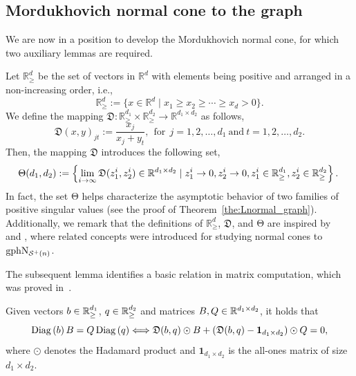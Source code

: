 \subsection{Mordukhovich normal cone to the graph}\label{sec:Mordukhovichnormalcone}
We are now in a position to develop the Mordukhovich normal cone, for which two auxiliary lemmas are required.


Let $\mathbb{R} _{\ge}^{d}$ be the set of vectors in $\mathbb{R}^{d}$ with elements being positive and arranged in a non-increasing order, i.e.,
\begin{equation*}
    \mathbb{R} _{\ge}^{d}:=\{ x\in \mathbb{R} ^d\mid x_1\ge x_2\ge \cdots \ge x_d>0 \}.
\end{equation*}
We define the mapping $\mathfrak{D}:\mathbb{R} _{\ge}^{d_1}\times \mathbb{R} _{\ge}^{d_2}\rightarrow \mathbb{R} ^{d_1\times d_2}$ as follows,
\begin{equation*}
    \mathfrak{D}( x,y) _{jt}:=\frac{x_j}{x_j+y_t},\ \ \text{for}\ \ j=1,2,\dots,d_1\ \text{and}\ t=1,2,\ldots,d_2.
\end{equation*}
Then, the mapping $\mathfrak{D}$ introduces the following set,
\begin{equation}\label{eq:varTheta}
    \!\!\mathrm{\Theta}( d_1,d_2 ) :=\left\{ { \lim _{i\rightarrow \infty}\mathfrak{D}( z_{1}^{i},z_{2}^{i} )\in \mathbb{R} ^{d_1\times d_2}\mid z_{1}^{i}\rightarrow 0,z_{2}^{i}\rightarrow 0,z_{1}^{i}\in \mathbb{R} _{\ge}^{d_1},z_{2}^{i}\in \mathbb{R} _{\ge}^{d_2} } \right\}.
\end{equation}
In fact, the set $\mathrm{\Theta}$ helps characterize the asymptotic behavior of two families of positive singular values (see the proof of Theorem~\ref{the:Lnormal_graph}). Additionally, we remark that the definitions of $\mathbb{R} _{\ge}^{d}$, $\mathfrak{D}$, and $\mathrm{\Theta}$ are inspired by~\cite[\S3.2]{ding2014SDCMPCC} and \cite[\S3.2]{wu2014SDCMPCC}, where related concepts were introduced for studying normal cones to $\mathrm{gph}\mathrm{N}_{\mathcal{S}^+(n)}$.

The subsequent lemma identifies a basic relation in matrix computation, which was proved in~\cite[Lemma~2.2]{wu2014SDCMPCC}. 

\begin{lemma}\label{lem:D_equivalence}
    Given vectors $b\in\mathbb{R}^{d_1}_{\ge}$, $q\in\mathbb{R}^{d_2}_\ge$ and matrices $B,Q\in\mathbb{R}^{d_1\times d_2}$, it holds that
    \begin{equation*}
        \operatorname{Diag}\left( b \right) B=Q\operatorname{Diag}\left( q \right) \Longleftrightarrow \mathfrak{D}(b,q) \odot B+\left(\mathfrak{D}(b,q) -{\bm 1}_{d_1\times d_2} \right) \odot Q=0,
    \end{equation*}
    where $\odot$ denotes the Hadamard product and ${\bm 1}_{d_1\times d_2}$ is the all-ones matrix of size $d_1\times d_2$.
\end{lemma}


